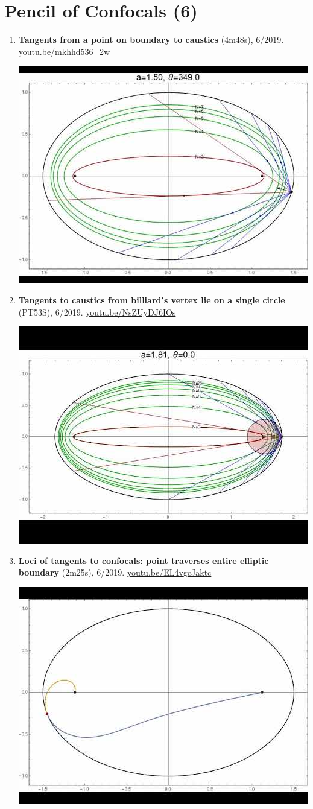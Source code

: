 \documentclass[12pt]{article}
\begin{document}
\section{Pencil of Confocals (6)}

\begin{enumerate}[resume]
\item \textbf{Tangents from a point on boundary to caustics} (4m48s), 6/2019. \href{https://youtu.be/mkhhd536_2w}{\url{youtu.be/mkhhd536\_2w}}
\begin{center}\includegraphics[width=.5\textwidth]{pics/mkhhd536_2w.jpg}\end{center}
% 
\item \textbf{Tangents to caustics from billiard's vertex lie on a single circle} (PT53S), 6/2019. \href{https://youtu.be/NsZUyDJ6IOs}{\url{youtu.be/NsZUyDJ6IOs}}
\begin{center}\includegraphics[width=.5\textwidth]{pics/NsZUyDJ6IOs.jpg}\end{center}
% 
\item \textbf{Loci of tangents to confocals: point traverses entire elliptic boundary} (2m25s), 6/2019. \href{https://youtu.be/EL4vgcJaktc}{\url{youtu.be/EL4vgcJaktc}}
\begin{center}\includegraphics[width=.5\textwidth]{pics/EL4vgcJaktc.jpg}\end{center}

\end{enumerate}
\end{document}
